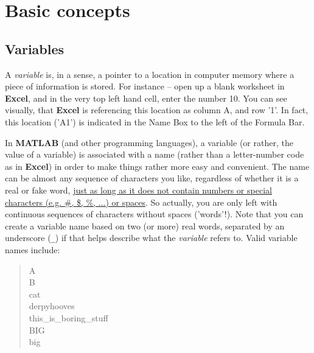 \documentclass{tufte-book} %
\newenvironment{docspec}{\begin{quotation}\ttfamily\parskip0pt\parindent0pt\ignorespaces}{\end{quotation}}
\begin{document}

\section{Basic concepts}


\subsection{Variables}

A \textit{variable} is, in a sense, a pointer to a location in computer memory where a piece of information is stored. For instance -- open up a blank worksheet in \textbf{Excel}, and in the very top left hand cell, enter the number \textsf{10}. You can see visually, that \textbf{Excel} is referencing this location as column A, and row '1'. In fact, this location ('\textsf{A1}') is indicated in the \textsf{Name Box} to the left of the \textsf{Formula Bar}.

In \textbf{MATLAB} (and other programming languages), a variable (or rather, the value of a variable) is associated with a name (rather than a letter-number code as in \textbf{Excel}) in order to make things rather more easy and convenient. The name can be almost any sequence of characters you like, regardless of whether it is a real or fake word, \uline{just as long as it does not contain numbers or special characters (e.g. \#, \$, \%, ...) or spaces}. So actually, you are only left with continuous sequences of characters without spaces ('words'!). Note that you can  create a variable name based on two (or more) real words, separated by an underscore (\texttt{\_}) if that helps describe what the \textit{variable} refers to. Valid variable names  include:

\begin{docspec}
A\\
B\\
cat\\
derpyhooves\\
this\_is\_boring\_stuff\\
BIG\\
big
\end{docspec}  
\end{document}
